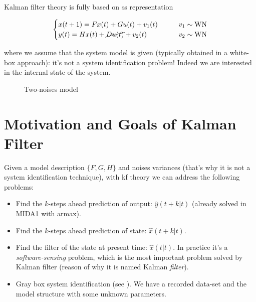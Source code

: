 Kalman filter theory is fully based on \acrfull{ss} representation

\[
    \begin{cases}
        x(t+1) = Fx(t) + Gu(t) + v_1(t)  & \qquad v_1 \sim \operatorname{WN} \\
        y(t) = Hx(t) + \cancel{Du(t)} + v_2(t) & \qquad v_2 \sim \operatorname{WN}
    \end{cases}
\]

where we assume that the system model is given (typically obtained in a white-box approach): it's not a system identification problem! Indeed we are interested in the internal state of the system.

\begin{figure}[H]
    \centering
    \caption*{Two-noises model}
\end{figure}


\section{Motivation and Goals of Kalman Filter}

Given a model description $\{F, G, H\}$ and noises variances (that's why it is not a system identification technique), with \acrfull{kf} theory we can address the following problems:

\begin{itemize}
    \item Find the $k$-steps ahead prediction of output: $\hat{y}(t+k|t)$ (already solved in MIDA1 with \gls{armax}).
    \item Find the $k$-steps ahead prediction of state: $\hat{x}(t+k|t)$.
    \item Find the filter of the state at present time: $\hat{x}(t|t)$. In practice it's a \emph{software-sensing} problem, which is the most important problem solved by Kalman filter (reason of why it is named Kalman \emph{filter}).
    \item Gray box system identification (see ). We have a recorded data-set and the model structure with some unknown parameters.
\end{itemize}


